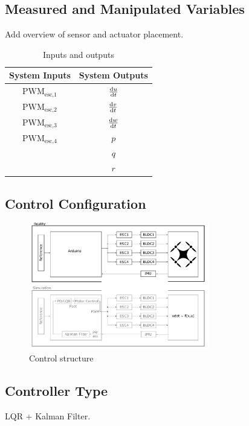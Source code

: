 \subsection{Measured and Manipulated Variables}
Add overview of sensor and actuator placement. 
\begin{table}[htb!]
	\centering
	\begin{tabular}{c@{\quad}|c@{\quad}}
		\hline
		\rule{0pt}{12pt} 
		System Inputs & System Outputs
		\\[2pt]
		\hline\rule{0pt}{12pt} 
		$\text{PWM}_\text{esc,1}$ & $\frac{\text{d}u}{\text{d}t}$ \\
		$\text{PWM}_\text{esc,2}$ & $\frac{\text{d}v}{\text{d}t}$ \\
		$\text{PWM}_\text{esc,3}$ & $\frac{\text{d}w}{\text{d}t}$ \\
		$\text{PWM}_\text{esc,4}$ & $p$ \\
		& $q$ \\
		& $r$ \\
		\hline
	\end{tabular}
	\vspace{6mm}
	\caption{Inputs and outputs} 
	\label{tab:mdl_gcai_paramSim}
\end{table}
\clearpage

\subsection{Control Configuration}
\begin{figure}[htb!]
	\centering
	\includegraphics[width=0.7\textwidth]{02_figures/controlStructure}
	\caption{Control structure}
	\label{fig:controlStructure}
\end{figure}
\clearpage
\clearpage

\subsection{Controller Type}
LQR + Kalman Filter.
\clearpage

